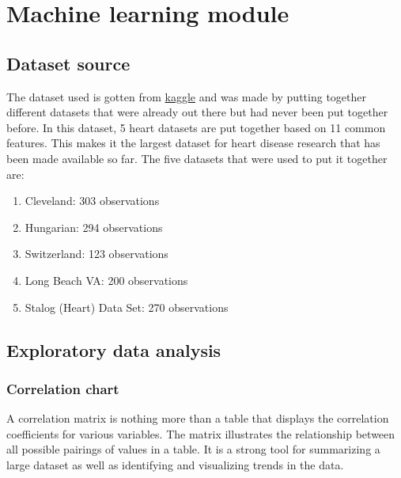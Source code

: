 
\section{Machine learning module}
\subsection{Dataset source}
The dataset used is gotten from \href{https://www.kaggle.com/datasets/fedesoriano/heart-failure-prediction}{kaggle} and was made by putting together different datasets that were already out there but had never been put together before. In this dataset, 5 heart datasets are put together based on 11 common features. This makes it the largest dataset for heart disease research that has been made available so far. The five datasets that were used to put it together are:
\begin{enumerate}[label=(\alph*)]
	\item Cleveland: 303 observations
	\item Hungarian: 294 observations
	\item Switzerland: 123 observations
	\item Long Beach VA: 200 observations
	\item Stalog (Heart) Data Set: 270 observations
\end{enumerate}


\subsection{Exploratory data analysis}

\subsubsection{Correlation chart}
A correlation matrix is nothing more than a table that displays the correlation coefficients for various variables. The matrix illustrates the relationship between all possible pairings of values in a table. It is a strong tool for summarizing a large dataset as well as identifying and visualizing trends in the data.

